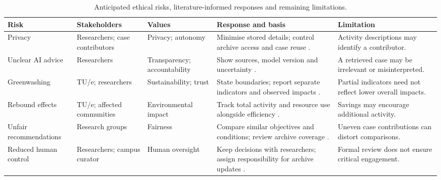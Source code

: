 \begin{table}[!htbp]
\centering
\footnotesize
\setlength{\tabcolsep}{4pt}
\renewcommand{\arraystretch}{1.35}
\begin{tabularx}{\textwidth}{@{}>{\raggedright\arraybackslash}p{}>{\raggedright\arraybackslash}p{}>{\raggedright\arraybackslash}p{}>{\raggedright\arraybackslash}X>{\raggedright\arraybackslash}p{}@{}}
\toprule
Risk & Stakeholders & Values & Response and basis & Limitation \\
\midrule
Privacy & Researchers; case contributors & Privacy; autonomy & Minimise stored details; control archive access and case reuse \citep{hasselbalch2025sustainability}. & Activity descriptions may identify a contributor. \\
\midrule
Unclear AI advice & Researchers & Transparency; accountability & Show sources, model version and uncertainty \citep{lacoste2019carbon}. & A retrieved case may be irrelevant or misinterpreted. \\
\midrule
Greenwashing & TU/e; researchers & Sustainability; trust & State boundaries; report separate indicators and observed impacts \citep{lin2023cost}. & Partial indicators need not reflect lower overall impacts. \\
\midrule
Rebound effects & TU/e; affected communities & Environmental impact & Track total activity and resource use alongside efficiency \citep{luccioni2025rebound}. & Savings may encourage additional activity. \\
\midrule
Unfair recommendations & Research groups & Fairness & Compare similar objectives and conditions; review archive coverage \citep{hasselbalch2025sustainability}. & Uneven case contributions can distort comparisons. \\
\midrule
Reduced human control & Researchers; campus curator & Human oversight & Keep decisions with researchers; assign responsibility for archive updates \citep{santoni2018control}. & Formal review does not ensure critical engagement. \\
\bottomrule
\end{tabularx}
\caption{Anticipated ethical risks, literature-informed responses and remaining limitations.}
\label{tab:ethical-risks}
\end{table}
